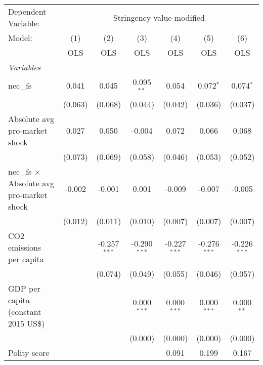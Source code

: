 
\begingroup
\centering
\begin{tabular}{lcccccc}
   \toprule
   Dependent Variable: & \multicolumn{6}{c}{Stringency value modified}\\
   Model:                                           & (1)     & (2)            & (3)            & (4)            & (5)            & (6)\\  
                                                    &  OLS    & OLS            & OLS            & OLS            & OLS            & OLS\\  
   \midrule
   \emph{Variables}\\
   nec\_fs                                          & 0.041   & 0.045          & 0.095$^{**}$   & 0.054          & 0.072$^{*}$    & 0.074$^{*}$\\   
                                                    & (0.063) & (0.068)        & (0.044)        & (0.042)        & (0.036)        & (0.037)\\   
   Absolute avg pro-market shock                    & 0.027   & 0.050          & -0.004         & 0.072          & 0.066          & 0.068\\   
                                                    & (0.073) & (0.069)        & (0.058)        & (0.046)        & (0.053)        & (0.052)\\   
   nec\_fs $\times$ Absolute avg pro-market shock   & -0.002  & -0.001         & 0.001          & -0.009         & -0.007         & -0.005\\   
                                                    & (0.012) & (0.011)        & (0.010)        & (0.007)        & (0.007)        & (0.007)\\   
   CO2 emissions per capita                         &         & -0.257$^{***}$ & -0.290$^{***}$ & -0.227$^{***}$ & -0.276$^{***}$ & -0.226$^{***}$\\   
                                                    &         & (0.074)        & (0.049)        & (0.055)        & (0.046)        & (0.057)\\   
   GDP per capita (constant 2015 US\$)              &         &                & 0.000$^{***}$  & 0.000$^{***}$  & 0.000$^{***}$  & 0.000$^{**}$\\   
                                                    &         &                & (0.000)        & (0.000)        & (0.000)        & (0.000)\\   
   Polity score                                     &         &                &                & 0.091          & 0.199          & 0.167\\   

\end{tabular}
